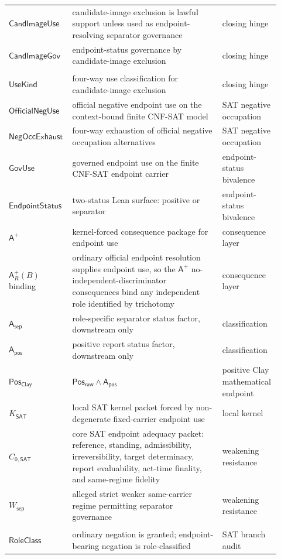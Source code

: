 \documentclass[11pt]{article}
\theoremstyle{definition}
\theoremstyle{remark}
\newcommand{\PosRaw}{\mathsf{Pos}_{\mathsf{raw}}}
\newcommand{\Asep}{\mathsf{A}_{\mathsf{sep}}}
\newcommand{\Apos}{\mathsf{A}_{\mathsf{pos}}}
\newcommand{\PosClay}{\mathsf{Pos}_{\mathsf{Clay}}}
\newcommand{\Aplus}{\mathsf{A}^{+}}
\newcommand{\CandImageGov}{\mathsf{CandImageGov}}
\newcommand{\KSAT}{K_{\mathsf{SAT}}}
\newcommand{\CoreSAT}{C_{0,\mathsf{SAT}}}
\newcommand{\WeakSep}{W_{\mathsf{sep}}}
\begin{document}
\begin{longtable}{>{\raggedright\arraybackslash}p{0.21\linewidth}>{\raggedright\arraybackslash}p{0.54\linewidth}>{\raggedright\arraybackslash}p{0.17\linewidth}}
\(\mathsf{CandImageUse}\) & candidate-image exclusion is lawful support unless used as endpoint-resolving separator governance & closing hinge \\
\(\CandImageGov\) & endpoint-status governance by candidate-image exclusion & closing hinge \\
\begin{tabular}[t]{@{}l@{}}\(\mathsf{CandImage}\)\\\(\mathsf{UseKind}\)\end{tabular} & four-way use classification for candidate-image exclusion & closing hinge \\
\(\mathsf{OfficialNegUse}\) & official negative endpoint use on the context-bound finite CNF-SAT model & SAT negative occupation \\
\(\mathsf{NegOccExhaust}\) & four-way exhaustion of official negative occupation alternatives & SAT negative occupation \\
\(\mathsf{GovUse}\) & governed endpoint use on the finite CNF-SAT endpoint carrier & endpoint-status bivalence \\
\(\mathsf{EndpointStatus}\) & two-status Lean surface: positive or separator & endpoint-status bivalence \\
\(\Aplus\) & kernel-forced consequence package for endpoint use & consequence layer \\
\(\Aplus_R(B)\) binding & ordinary official endpoint resolution supplies endpoint use, so the \(\Aplus\) no-independent-discriminator consequences bind any independent role identified by trichotomy & consequence layer \\
\(\Asep\) & role-specific separator status factor, downstream only & classification \\
\(\Apos\) & positive report status factor, downstream only & classification \\
\(\PosClay\) & \(\PosRaw\wedge\Apos\) & positive Clay mathematical endpoint \\
\(\KSAT\) & local SAT kernel packet forced by non-degenerate fixed-carrier endpoint use & local kernel \\
\(\CoreSAT\) & core SAT endpoint adequacy packet: reference, standing, admissibility, irreversibility, target determinacy, report evaluability, act-time finality, and same-regime fidelity & weakening resistance \\
\(\WeakSep\) & alleged strict weaker same-carrier regime permitting separator governance & weakening resistance \\
\begin{tabular}[t]{@{}l@{}}\(\mathsf{OrdNeg}\)\\\(\mathsf{RoleClass}\)\end{tabular} & ordinary negation is granted; endpoint-bearing negation is role-classified & SAT branch audit \\

\end{longtable}
\end{document}
